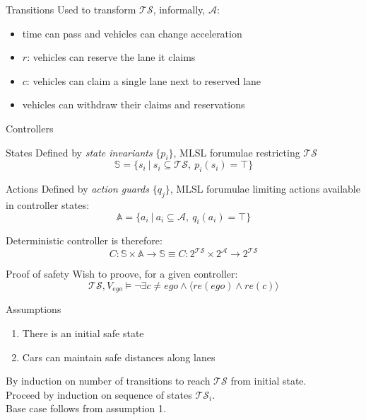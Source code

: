 \documentclass[xcolor=table]{beamer}
\begin{document}
\begin{frame}{Transitions}
Used to transform $\mathcal{TS}$, informally, $\mathcal{A}$:
\begin{itemize}
	\item time can pass and vehicles can change acceleration
	\item $r$: vehicles can reserve the lane it claims
	\item $c$: vehicles can claim a single lane next to reserved lane
	\item vehicles can withdraw their claims and reservations
\end{itemize}

\end{frame}

\begin{frame}{Controllers}
\begin{block}{States}
	Defined by \textit{state invariants} $\{p_i\}$, MLSL forumulae restricting $\mathcal{TS}$\\
	$$\mathbb{S} = \{s_i\ |\ s_i \subseteq \mathcal{TS},\ p_i(s_i) = \top \}$$
\end{block}
\pause
\begin{block}{Actions}
	Defined by \textit{action guards} $\{q_j\}$, MLSL forumulae limiting actions available in controller states:
	$$\mathbb{A} = \{a_i\ |\ a_i \subseteq \mathcal{A},\ q_i(a_i) = \top \}$$
\end{block}
\pause
Deterministic controller is therefore:
$$C : \mathbb{S} \times \mathbb{A} \to \mathbb{S} \equiv C:2^\mathcal{TS} \times 2^\mathcal{A} \to 2^\mathcal{TS}$$
\end{frame}

\begin{frame}{Proof of safety}
Wish to proove, for a given controller:
\begin{equation*}\label{eq:safety_goal}
\mathcal{TS}, V_{ego} \models \neg \exists c \neq ego \land \langle re(ego) \land re(c)\rangle
\end{equation*}
\pause 
\begin{block}{Assumptions}
	\begin{enumerate}
		\item There is an initial safe state
		\item Cars can maintain safe distances along lanes
	\end{enumerate}
\end{block}

\pause
\bigskip
By induction on number of transitions to reach $\mathcal{TS}$ from initial state.\\
\bigskip
\pause
Proceed by induction on sequence of states $\mathcal{TS}_i$.\\
\bigskip
\pause
Base case follows from assumption 1.

\end{frame}
\end{document}
